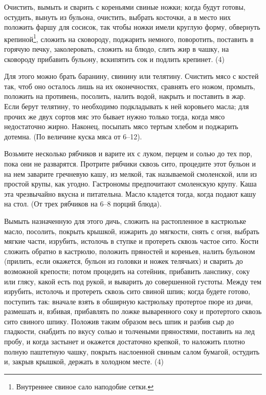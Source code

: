 
Очистить, вымыть и сварить с кореньями свиные ножки; когда будут готовы, остудить, вынуть из бульона, очистить, выбрать косточки, а в место них положить фаршу для сосисок, так чтобы ножки имели круглую форму, обвернуть крепиной\footnote{Внутреннее свиное сало наподобие сетки.}, сложить на сковороду, поджарить немного, поворотить, поставить в горячую печку, заколеровать, сложить на блюдо, слить жир в чашку, на сковороду прибавить бульону, вскипятить сок и подлить крепинет. (4) 


Для этого можно брать баранину, свинину или телятину. Счистить мясо с костей так, чтоб оно осталось лишь на их оконечностях, сравнять его ножом, промыть, положить на противень, посолить, налить водой, накрыть и поставить в жар. Если берут телятину, то необходимо подкладывать к ней коровьего масла; для прочих же двух сортов мяс это бывает нужно только тогда, когда мясо недостаточно жирно. Наконец, посыпать мясо тертым хлебом и поджарить дотемна. (По величине куска мяса от 6--12). 


Возьмите несколько рябчиков и варите их с луком, перцем и солью до тех пор, пока они не разварятся. Протрите рябчики сквозь сито, процедите этот бульон и на нем заварите гречневую кашу, из мелкой, так называемой смоленской, или из простой крупы, как угодно. Гастрономы предпочитают смоленскую крупу. Каша эта чрезвычайно вкусна и питательна. Масло кладется тогда, когда подают кашу на стол. (От трех рябчиков на 6--8 порций блюда).


Вымыть назначенную для этого дичь, сложить на растопленное в кастрюльке масло, посолить, покрыть крышкой, изжарить до мягкости, снять с огня, выбрать мягкие части, изрубить, истолочь в ступке и протереть сквозь частое сито. Кости сложить обратно в кастрюлю, положить пряностей и кореньев, налить бульоном (прилить, если окажется, бульон из головки и ножек телячьих) и сварить до возможной крепости; потом процедить на сотейник, прибавить ланспику, соку или глясу, какой есть под рукой, и выварить до совершенной густоты. Между тем изрубить, истолочь и протереть сквозь сито свиной шпик; когда будете готово, поступить так: вначале взять в обширную кастрюльку протертое пюре из дичи, размешать и, взбивая, прибавлять по ложке вываренного соку и протертого сквозь сито свиного шпику. Положив таким образом весь шпик и разбив сыр до гладкости, снабдить по вкусу солью и толчеными пряностями, поставить на лед пробу, и когда застынет и окажется достаточно крепкой, то наложить плотно полную паштетную чашку, покрыть наслоенной свиным салом бумагой, остудить и, закрыв крышкой, держать в холодном месте. (4) 

